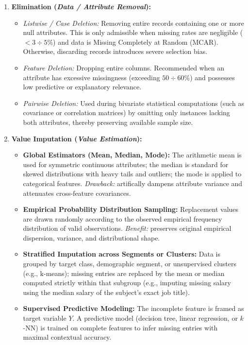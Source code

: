 \begin{enumerate}
    \item \textbf{Elimination (\textit{Data / Attribute Removal}):}
    \begin{itemize}
        \item \textit{Listwise / Case Deletion:} Removing entire records containing one or more null attributes. This is only admissible when missing rates are negligible ($< 3\div 5\%$) and data is Missing Completely at Random (MCAR). Otherwise, discarding records introduces severe selection bias.
        \item \textit{Feature Deletion:} Dropping entire columns. Recommended when an attribute has excessive missingness (exceeding $50\div 60\%$) and possesses low predictive or explanatory relevance.
        \item \textit{Pairwise Deletion:} Used during bivariate statistical computations (such as covariance or correlation matrices) by omitting only instances lacking both attributes, thereby preserving available sample size.
    \end{itemize}

    \item \textbf{Value Imputation (\textit{Value Estimation}):}
    \begin{itemize}
        \item \textbf{Global Estimators (Mean, Median, Mode):}
        The arithmetic mean is used for symmetric continuous attributes; the median is standard for skewed distributions with heavy tails and outliers; the mode is applied to categorical features. \textit{Drawback:} artifically dampens attribute variance and attenuates cross-feature covariances.
        \item \textbf{Empirical Probability Distribution Sampling:}
        Replacement values are drawn randomly according to the observed empirical frequency distribution of valid observations. \textit{Benefit:} preserves original empirical dispersion, variance, and distributional shape.
        \item \textbf{Stratified Imputation across Segments or Clusters:}
        Data is grouped by target class, demographic segment, or unsupervised clusters (e.g., k-means); missing entries are replaced by the mean or median computed strictly within that subgroup (e.g., imputing missing salary using the median salary of the subject's exact job title).
        \item \textbf{Supervised Predictive Modeling:}
        The incomplete feature is framed as target variable $Y$. A predictive model (decision tree, linear regression, or $k$-NN) is trained on complete features to infer missing entries with maximal contextual accuracy.
    \end{itemize}


\end{enumerate}
